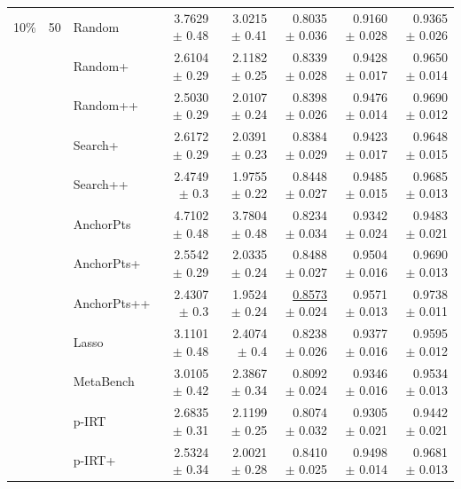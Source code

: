 \begin{longtable}{llp{}rrrrr}
\midrule
10\% & 50 & Random & 3.7629 {\scriptsize $\pm$ 0.48} & 3.0215 {\scriptsize $\pm$ 0.41} & 0.8035 {\scriptsize $\pm$ 0.036} & 0.9160 {\scriptsize $\pm$ 0.028} & 0.9365 {\scriptsize $\pm$ 0.026} \\
 &  & Random+ & 2.6104 {\scriptsize $\pm$ 0.29} & 2.1182 {\scriptsize $\pm$ 0.25} & 0.8339 {\scriptsize $\pm$ 0.028} & 0.9428 {\scriptsize $\pm$ 0.017} & 0.9650 {\scriptsize $\pm$ 0.014} \\
 &  & Random++ & 2.5030 {\scriptsize $\pm$ 0.29} & 2.0107 {\scriptsize $\pm$ 0.24} & 0.8398 {\scriptsize $\pm$ 0.026} & 0.9476 {\scriptsize $\pm$ 0.014} & 0.9690 {\scriptsize $\pm$ 0.012} \\
 &  & Search+ & 2.6172 {\scriptsize $\pm$ 0.29} & 2.0391 {\scriptsize $\pm$ 0.23} & 0.8384 {\scriptsize $\pm$ 0.029} & 0.9423 {\scriptsize $\pm$ 0.017} & 0.9648 {\scriptsize $\pm$ 0.015} \\
 &  & Search++ & 2.4749 {\scriptsize $\pm$ 0.3} & 1.9755 {\scriptsize $\pm$ 0.22} & 0.8448 {\scriptsize $\pm$ 0.027} & 0.9485 {\scriptsize $\pm$ 0.015} & 0.9685 {\scriptsize $\pm$ 0.013} \\
 &  & AnchorPts & 4.7102 {\scriptsize $\pm$ 0.48} & 3.7804 {\scriptsize $\pm$ 0.48} & 0.8234 {\scriptsize $\pm$ 0.034} & 0.9342 {\scriptsize $\pm$ 0.024} & 0.9483 {\scriptsize $\pm$ 0.021} \\
 &  & AnchorPts+ & 2.5542 {\scriptsize $\pm$ 0.29} & 2.0335 {\scriptsize $\pm$ 0.24} & 0.8488 {\scriptsize $\pm$ 0.027} & 0.9504 {\scriptsize $\pm$ 0.016} & 0.9690 {\scriptsize $\pm$ 0.013} \\
 &  & AnchorPts++ & 2.4307 {\scriptsize $\pm$ 0.3} & 1.9524 {\scriptsize $\pm$ 0.24} & \underline{0.8573} {\scriptsize $\pm$ 0.024} & 0.9571 {\scriptsize $\pm$ 0.013} & 0.9738 {\scriptsize $\pm$ 0.011} \\
 &  & Lasso & 3.1101 {\scriptsize $\pm$ 0.48} & 2.4074 {\scriptsize $\pm$ 0.4} & 0.8238 {\scriptsize $\pm$ 0.026} & 0.9377 {\scriptsize $\pm$ 0.016} & 0.9595 {\scriptsize $\pm$ 0.012} \\
 &  & MetaBench & 3.0105 {\scriptsize $\pm$ 0.42} & 2.3867 {\scriptsize $\pm$ 0.34} & 0.8092 {\scriptsize $\pm$ 0.024} & 0.9346 {\scriptsize $\pm$ 0.016} & 0.9534 {\scriptsize $\pm$ 0.013} \\
 &  & p-IRT & 2.6835 {\scriptsize $\pm$ 0.31} & 2.1199 {\scriptsize $\pm$ 0.25} & 0.8074 {\scriptsize $\pm$ 0.032} & 0.9305 {\scriptsize $\pm$ 0.021} & 0.9442 {\scriptsize $\pm$ 0.021} \\
 &  & p-IRT+ & 2.5324 {\scriptsize $\pm$ 0.34} & 2.0021 {\scriptsize $\pm$ 0.28} & 0.8410 {\scriptsize $\pm$ 0.025} & 0.9498 {\scriptsize $\pm$ 0.014} & 0.9681 {\scriptsize $\pm$ 0.013} \\

\end{longtable}
